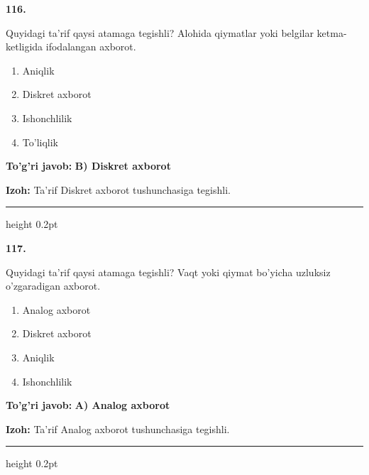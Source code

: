 \documentclass[10pt,a4paper,oneside]{article}
\begin{document}
\noindent\textbf{\color{ink}116.}
\par
Quyidagi ta'rif qaysi atamaga tegishli? Alohida qiymatlar yoki belgilar ketma-ketligida ifodalangan axborot.
\begin{enumerate}[label=\Alph*),leftmargin=9mm]
\item Aniqlik
\item Diskret axborot
\item Ishonchlilik
\item To'liqlik
\end{enumerate}
\begin{tcolorbox}[enhanced,breakable,colback=teal!4,colframe=teal!50!black,boxrule=0.5pt,arc=1.1mm,left=3mm,right=3mm,top=1.7mm,bottom=1.7mm,before skip=2mm,after skip=2mm]
\textbf{\color{teal}To'g'ri javob:} \textbf{B) Diskret axborot}
\par\smallskip
\textbf{Izoh:} Ta'rif Diskret axborot tushunchasiga tegishli.
\end{tcolorbox}
\vspace{2mm}\hrule height 0.2pt \vspace{3mm}

\noindent\textbf{\color{ink}117.}
\par
Quyidagi ta'rif qaysi atamaga tegishli? Vaqt yoki qiymat bo'yicha uzluksiz o'zgaradigan axborot.
\begin{enumerate}[label=\Alph*),leftmargin=9mm]
\item Analog axborot
\item Diskret axborot
\item Aniqlik
\item Ishonchlilik
\end{enumerate}
\begin{tcolorbox}[enhanced,breakable,colback=teal!4,colframe=teal!50!black,boxrule=0.5pt,arc=1.1mm,left=3mm,right=3mm,top=1.7mm,bottom=1.7mm,before skip=2mm,after skip=2mm]
\textbf{\color{teal}To'g'ri javob:} \textbf{A) Analog axborot}
\par\smallskip
\textbf{Izoh:} Ta'rif Analog axborot tushunchasiga tegishli.
\end{tcolorbox}
\vspace{2mm}\hrule height 0.2pt \vspace{3mm}
\end{document}

